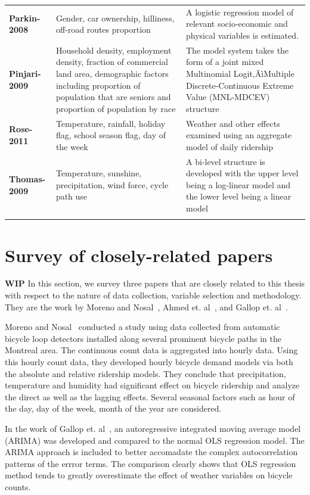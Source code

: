 \documentclass [11pt, proquest] {uwthesis}[2015/03/03]
\begin{document}
\begin{center}
\begin{scriptsize}
\begin{tabular}{p{3cm} p{7cm} p{5cm}}
  \textbf{Parkin-2008} & Gender, car ownership, hilliness, off-road routes proportion & A logistic regression model of relevant socio-economic and physical variables is estimated. \\
  \textbf{Pinjari-2009} & Household density, employment density, fraction of commercial land area, demographic factors including proportion of population that are seniors and proportion of population by race & The model system takes the form of a joint mixed Multinomial Logit‚ÄìMultiple Discrete-Continuous Extreme Value (MNL-MDCEV) structure \\
  \textbf{Rose-2011} & Temperature, rainfall, holiday flag, school season flag, day of the week & Weather and other effects examined using an aggregate model of daily ridership \\
  \textbf{Thomas-2009} & Temperature, sunshine, precipitation, wind force, cycle path use & A bi-level structure is developed with the upper level being a log-linear model and the lower level being a linear model \\ [1ex] 
 \hline
\label{tb:lit}
\end{tabular}
\end{scriptsize}
\end{center}

\section{Survey of closely-related papers}
\textbf{WIP}
In this section, we survey three papers that are closely related to this thesis with respect to the nature of data collection, variable selection and methodology. They are the work by Moreno and Nosal~\cite{Miranda-Moreno:2011aa}, Ahmed et. al~\cite{Ahmed12}, and Gallop et. al~\cite{Gallop:2012aa}.

Moreno and Nosal~\cite{Miranda-Moreno:2011aa} conducted a study using data collected from automatic bicycle loop detectors installed along several prominent bicycle paths in the Montreal area. The continuous count data is aggregated into hourly data. Using this hourly count data, they developed hourly bicycle demand models via both the absolute and relative ridership models. They conclude that precipitation, temperature and humidity  had significant effect on bicycle ridership and analyze the direct as well as the lagging effects. Several seasonal factors such as hour of the day, day of the week, month of the year are considered.


In the work of Gallop et. al~\cite{Gallop:2012aa}, an autoregressive integrated moving average model (ARIMA) was developed and compared to the normal OLS regression model. The ARIMA approach is included to better accomadate the complex autocorrelation patterns of the errror terms. The comparison clearly shows that OLS regression method tends to greatly overestimate the effect of weather variables on bicycle counts. 
\end{document}
